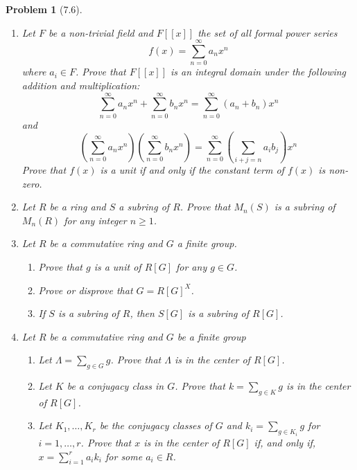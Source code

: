 \documentclass[10pt]{article}
\theoremstyle{plain}
\newtheorem{problem}{Problem}
\theoremstyle{remark}
\begin{document}
\begin{problem}[7.6]
  \begin{enumerate}
  \item Let $F$ be a non-trivial field and $F[[x]]$ the set of all
    formal power series
    \[ f(x)=\sum_{n=0}^\infty a_nx^n \]
    where $a_i\in F$. Prove that $F[[x]]$ is an integral domain under the
    following addition and multiplication:
    \[ \sum_{n=0}^\infty a_nx^n+\sum_{n=0}^\infty b_nx^n
      =\sum_{n=0}^\infty (a_n+b_n)x^n \]
    and
    \[ \left(\sum_{n=0}^\infty a_nx^n\right)
      \left(\sum_{n=0}^\infty b_nx^n\right)
      =\sum_{n=0}^\infty\left(\sum_{i+j=n}a_ib_j\right)x^n \]
    Prove that $f(x)$ is a unit if and only if the constant term of $f(x)$ is
    non-zero.
  \item Let $R$ be a ring and $S$ a subring of $R$. Prove that $M_n(S)$ is a
    subring of $M_n(R)$ for any integer $n\geq 1$.
  \item Let $R$ be a commutative ring and $G$ a finite group.
    \begin{enumerate}
    \item Prove that $g$ is a unit of $R[G]$ for any $g\in G$.
    \item Prove or disprove that $G=R[G]^X$.
    \item If $S$ is a subring of $R$, then $S[G]$ is a subring of $R[G]$.
    \end{enumerate}
  \item Let $R$ be a commutative ring and $G$ be a finite group
    \begin{enumerate}
    \item Let $\Lambda=\sum_{g\in G}g$. Prove that $\Lambda$ is in the center of
      $R[G]$.
    \item Let $K$ be a conjugacy class in $G$. Prove that
      $k=\sum_{g\in K}g$ is in the center of $R[G]$.
    \item Let $K_1,\ldots,K_r$ be the conjugacy classes of $G$ and
      $k_i=\sum_{g\in K_i}g$ for $i=1,\ldots,r$. Prove that $x$ is in the center
      of $R[G]$ if, and only if, $x=\sum_{i=1}^ra_ik_i$ for some $a_i\in R$.
    \end{enumerate}
  \end{enumerate}
\end{problem}
\end{document}
